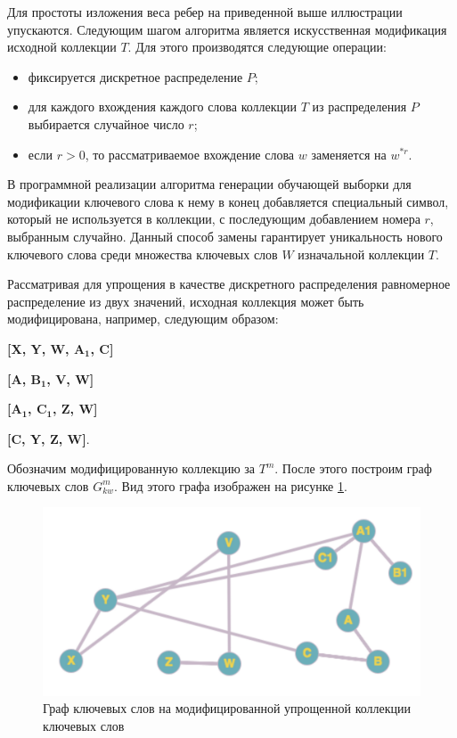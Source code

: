 Для простоты изложения веса ребер на приведенной выше иллюстрации упускаются. Следующим шагом алгоритма является искусственная модификация исходной коллекции $T$. Для этого производятся следующие операции:
\begin{itemize}
    \item фиксируется дискретное распределение $P$;
    \item для каждого вхождения каждого слова коллекции $T$ из распределения $P$ выбирается случайное число $r$;
    \item если $r > 0$, то рассматриваемое вхождение слова $w$ заменяется на $w^{\ast r}$.
\end{itemize}

В программной реализации алгоритма генерации обучающей выборки для модификации ключевого слова к нему в конец добавляется специальный символ, который не используется в коллекции, с последующим добавлением номера $r$, выбранным случайно. Данный способ замены гарантирует уникальность нового ключевого слова среди множества ключевых слов $W$ изначальной коллекции $T$.

Рассматривая для упрощения в качестве дискретного распределения равномерное распределение из двух значений, исходная коллекция может быть модифицирована, например, следующим образом:

\textbf{[X, Y, W, $\mathbf{A_1}$, C]}\

\textbf{[A, $\mathbf{B_1}$, V, W]}\

\textbf{[$\mathbf{A_1}$, $\mathbf{C_1}$, Z, W]}\

\textbf{[C, Y, Z, W]}.\

Обозначим модифицированную коллекцию за $T^m$. После этого построим граф ключевых слов $G^{m}_{kw}$. Вид этого графа изображен на рисунке \ref{img:art_train_graph_m}.

\begin{figure}[ht]
  \begin{minipage}[ht]{1.0\linewidth}\centering
    \includegraphics[width=0.7\linewidth]{Dissertation/pics/art_train_graph_m}
    \caption{Граф ключевых слов на модифицированной упрощенной коллекции ключевых слов}
    \label{img:art_train_graph_m}
  \end{minipage}
\end{figure}

